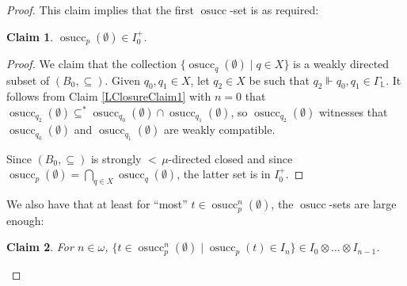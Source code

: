 \documentclass[a4paper]{amsart}
\theoremstyle{definition}
\theoremstyle{remark}
\theoremstyle{plain}
\newtheorem{myclaim}{Claim}
\numberwithin{mydef}{section}
\DeclareMathOperator{\osucc}{osucc}
\newcommand{\dL}{\mathbb{L}}
\begin{document}
\begin{proof}
		This claim implies that the first $\osucc$-set is as required:
		
		\begin{myclaim}\label{LClosureClaim2}
			$\osucc_p(\emptyset)\in I_0^+$.
		\end{myclaim}
		
		\begin{proof}
			We claim that the collection $\{\osucc_q(\emptyset)\;|\;q\in X\}$ is a weakly directed subset of $(B_0,\subseteq)$. Given $q_0,q_1\in X$, let $q_2\in X$ be such that $q_2\Vdash q_0,q_1\in\Gamma_{\dL}$. It follows from Claim \ref{LClosureClaim1} with $n=0$ that $\osucc_{q_2}(\emptyset)\subseteq^*\osucc_{q_0}(\emptyset)\cap\osucc_{q_1}(\emptyset)$, so $\osucc_{q_2}(\emptyset)$ witnesses that $\osucc_{q_0}(\emptyset)$ and $\osucc_{q_1}(\emptyset)$ are weakly compatible.
			
			Since $(B_0,\subseteq)$ is strongly ${<}\,\mu$-directed closed and since $\osucc_p(\emptyset)=\bigcap_{q\in X}\osucc_q(\emptyset)$, the latter set is in $I_0^+$.
		\end{proof}
		
		We also have that at least for ``most'' $t\in\osucc_p^n(\emptyset)$, the $\osucc$-sets are large enough:
		
		\begin{myclaim}\label{LClosureClaim3}
			For $n\in\omega$, $\{t\in\osucc_p^n(\emptyset)\;|\;\osucc_p(t)\in I_n\}\in I_0\otimes\dots\otimes I_{n-1}$.
		\end{myclaim}
		

\end{proof}
\end{document}
